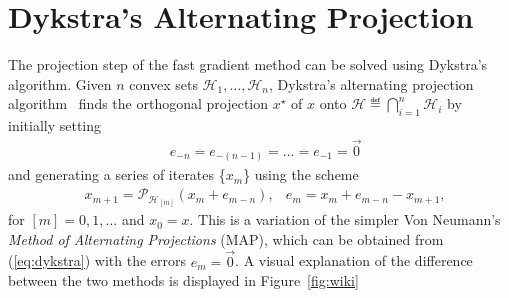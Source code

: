 \documentclass[hidelinks]{article}
\begin{document}
\section{Dykstra's Alternating Projection}
The projection step of the fast gradient method can be solved using Dykstra's algorithm.
Given $n$ convex sets $\mathcal{H}_1,\dots,\mathcal{H}_n$, Dykstra's alternating projection algorithm~\cite{DYKSTRAPERKINS} finds the orthogonal projection $x^\star$ of $x$ onto $\mathcal{H}\eqdef{\bigcap}_{i=1}^n \mathcal{H}_i$ by initially setting
%
\begin{align}\label{eq:initial error}
&e_{-n} = e_{-(n-1)} = ... = e_{-1} = \vec0
\end{align}
and generating a series of iterates \{$x_{m}$\} using the scheme
\begin{align}\label{eq:dykstra}
&x_{m+1}=\mathcal{P}_{\mathcal{H}_{[m]}}\left(x_{m}+e_{m-n}\right),
&e_m=x_{m}+e_{m-n}-x_{m+1},
\end{align}
for $[m]= 0,1,...$ and $x_0=x$.
%
\newline
This is a variation of the simpler Von Neumann's \emph{Method of Alternating Projections} (MAP), which can be obtained from (\ref{eq:dykstra}) with the errors $e_m = \vec0$. A visual explanation of the difference between the two methods is displayed in Figure~\ref{fig:wiki}
%
\end{document}
